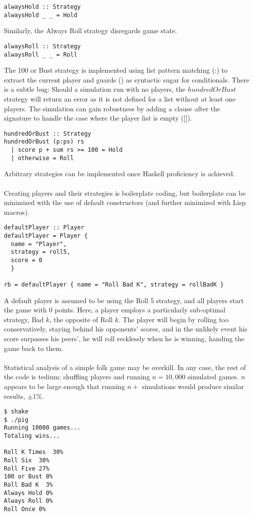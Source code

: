\documentclass{article}
\begin{document}
\begin{verbatim}
alwaysHold :: Strategy
alwaysHold _ _ = Hold
\end{verbatim}
Similarly, the Always Roll strategy disregards game state.
\begin{verbatim}
alwaysRoll :: Strategy
alwaysRoll _ _ = Roll
\end{verbatim}
The 100 or Bust strategy is implemented using list pattern matching (:) to extract the current player and guards (\textbar) as syntactic sugar for conditionals. There is a subtle bug: Should a simulation run with no players, the $hundredOrBust$ strategy will return an error as it is not defined for a list without at least one players. The simulation can gain robustness by adding a clause after the signature to handle the case where the player list is empty ([]).
\begin{verbatim}
hundredOrBust :: Strategy
hundredOrBust (p:ps) rs
  | score p + sum rs >= 100 = Hold
  | otherwise = Roll
\end{verbatim}
Arbitrary strategies can be implemented once Haskell proficiency is achieved.
\\\\
Creating players and their strategies is boilerplate coding, but boilerplate can be minimized with the use of default constructors (and further minimized with Lisp macros).
\begin{verbatim}
defaultPlayer :: Player
defaultPlayer = Player {
  name = "Player",
  strategy = roll5,
  score = 0
  }

rb = defaultPlayer { name = "Roll Bad K", strategy = rollBadK }
\end{verbatim}
A default player is assumed to be using the Roll 5 strategy, and all players start the game with 0 points. Here, a player employs a particularly sub-optimal strategy, Bad $k$, the opposite of Roll $k$. The player will begin by rolling too conservatively, staying behind his opponents' scores, and in the unlikely event his score surpasses his peers', he will roll recklessly when he is winning, handing the game back to them.
\\\\
Statistical analysis of a simple folk game may be overkill. In any case, the rest of the code is tedium: shuffling players and running $n = 10,000$ simulated games. $n$ appears to be large enough that running $n+$ simulations would produce similar results, $\pm 1\%$.
\begin{verbatim}
$ shake
$ ./pig
Running 10000 games...
Totaling wins...

Roll K Times  30%
Roll Six  30%
Roll Five 27%
100 or Bust 8%
Roll Bad K  3%
Always Hold 0%
Always Roll 0%
Roll Once 0%
\end{verbatim}
\end{document}
